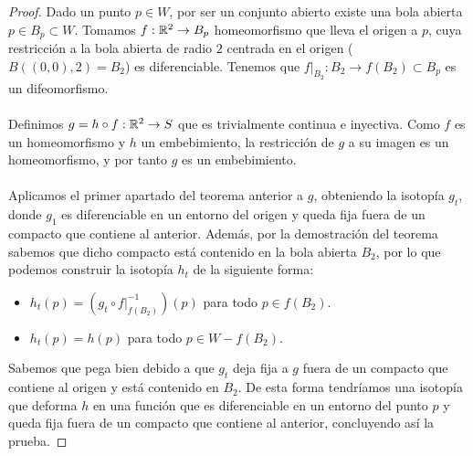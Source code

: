 \begin{proof}
	Dado un punto $p \in W$, por ser un conjunto abierto existe una bola abierta $p \in B_p \subset W$. Tomamos $f: \mathbb{R}^2 \rightarrow B_p$ homeomorfismo que lleva el origen a $p$, cuya restricción a la bola abierta de radio $2$ centrada en el origen ($B((0,0), 2)=B_2$) es diferenciable. Tenemos que $f|_{B_2} : B_2 \rightarrow f(B_2) \subset B_p$ es un difeomorfismo.\\
	\\Definimos $g=h \circ f: \mathbb{R}^2 \rightarrow S$ que es trivialmente continua e inyectiva. Como $f$ es un homeomorfismo y $h$ un embebimiento, la restricción de $g$ a su imagen es un homeomorfismo, y por tanto $g$ es un embebimiento.\\
	\\Aplicamos el primer apartado del teorema anterior a $g$, obteniendo la isotopía $g_t$, donde $g_1$ es diferenciable en un entorno del origen y queda fija fuera de un compacto que contiene al anterior. Además, por la demostración del teorema sabemos que dicho compacto está contenido en la bola abierta $B_2$, por lo que podemos construir la isotopía $h_t$ de la siguiente forma:
	\begin{itemize}
		\item $h_t(p)=(g_t \circ f|_{f(B_2)}^{-1})(p)$ para todo $p \in f(B_2)$.
		\item $h_t(p)=h(p)$ para todo $p \in W - f(B_2)$.
	\end{itemize}
	Sabemos que pega bien debido a que $g_t$ deja fija a $g$ fuera de un compacto que contiene al origen y está contenido en $B_2$. De esta forma tendríamos una isotopía que deforma $h$ en una función que es diferenciable en un entorno del punto $p$ y queda fija fuera de un compacto que contiene al anterior, concluyendo así la prueba.
\end{proof}


\endinput
